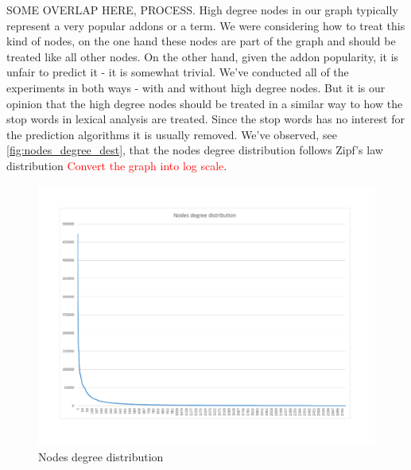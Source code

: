 \documentclass[11pt,oneside]{book}
\begin{document}
SOME OVERLAP HERE, PROCESS. High degree nodes in our graph typically represent a very popular
addons or a term. We were considering how to treat this kind of nodes,
on the one hand these nodes are part of the graph and should be
treated like all other nodes. On the other hand, given the addon
popularity, it is unfair to predict it - it is somewhat trivial. We've
conducted all of the experiments in both ways - with and without high
degree nodes. But it is our opinion that the high degree nodes should
be treated in a similar way to how the stop words in lexical analysis
are treated. Since the stop words has no interest for the prediction
algorithms it is usually removed. We've observed, see
\autoref{fig:nodes_degree_dest}, that the nodes degree distribution
follows Zipf's law distribution \textcolor{red}{Convert the graph into log scale}.
\begin{figure}[t]
\centering
\includegraphics[width=\linewidth]{figures/nodesDegreeDest.pdf}
\caption{Nodes degree distribution}
\label{fig:nodes_degree_dest}
\end{figure}
\end{document}
